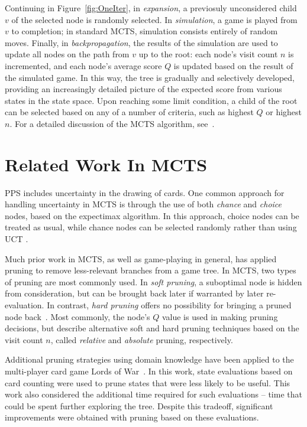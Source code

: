 \documentclass[letterpaper]{article}
\begin{document}
Continuing in Figure~\ref{fig:OneIter}, in {\it expansion}, a previosuly unconsidered child $v$ of the selected node is randomly selected. In {\it simulation}, a game is played from $v$ to completion; in standard MCTS, simulation consists entirely of random moves. Finally, in {\it backpropagation}, the results of the simulation are used to update all nodes on the path from $v$ up to the root: each node's visit count $n$ is incremented, and each node's average score $Q$ is updated based on the result of the simulated game. In this way, the tree is gradually and selectively developed, providing an increasingly detailed picture of the expected score from various states in the state space. Upon reaching some limit condition, a child of the root can be selected based on any of a number of criteria, such as highest $Q$ or highest $n$. For a detailed discussion of the MCTS algorithm, see~\cite{browne2012survey}.

\section{Related Work In MCTS}
\label{relatedWork}

PPS includes uncertainty in the drawing of cards. One common approach for handling uncertainty in MCTS is through the use of both {\it chance} and {\it choice} nodes, based on the expectimax  algorithm. In this approach, choice nodes can be treated as usual, while chance nodes can be selected randomly rather than using UCT \cite{melko2007optimal,hauk2004search}.

Much prior work in MCTS, as well as game-playing in general, has applied pruning to remove less-relevant branches from a game tree. In MCTS, two types of pruning are most commonly used. In {\it soft pruning}, a suboptimal node is hidden from consideration, but can be brought back later if warranted by later re-evaluation. In contrast, {\it hard pruning} offers no possibility for bringing a pruned node back~\cite{browne2012survey}. Most commonly, the node's $Q$ value is used in making pruning decisions, but \cite{huang2010pruning} describe alternative soft and hard pruning techniques based on the visit count $n$, called {\it relative} and {\it absolute} pruning, respectively.

Additional pruning strategies using domain knowledge have been applied to the multi-player card game Lords of War~\cite{sephton2014ieee}. In this work, state evaluations based on card counting were used to prune states that were less likely to be useful. This work also considered the additional time required for such evaluations -- time that could be spent further exploring the tree. Despite this tradeoff, significant improvements were obtained with pruning based on these evaluations.
\end{document}
